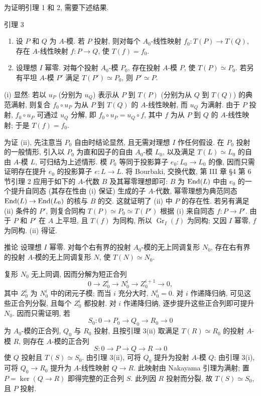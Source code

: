 为证明引理 1 和 2, 需要下述结果.

\begin{statement}{引理 3}
\begin{enumerate}[label=(\roman*)]
\item 设 $P$ 和 $Q$ 为 $A$-模. 若 $P$ 投射, 则对每个 $A_0$-线性映射 $f_0:T(P)\to T(Q)$, 存在 $A$-线性映射 $f:P\to Q$, 使 $T(f)=f_0$.
\item 设理想 $I$ 幂零. 对每个投射 $A_0$-模 $P_0$, 存在投射 $A$-模 $P$, 使 $T(P)\simeq P_0$. 若另有平坦 $A$-模 $P'$ 满足 $T(P')\simeq P_0$, 则 $P'\simeq P$.
\end{enumerate}
\end{statement}

(i) 显然: 若以 $u_P$ (分别为 $u_Q$) 表示从 $P$ 到 $T(P)$ (分别为从 $Q$ 到 $T(Q)$) 的典范满射, 则复合 $f_0\circ u_P$ 为从 $P$ 到 $T(Q)$ 的 $A$-线性映射, 而 $u_Q$ 为满射. 由于 $P$ 投射, $f_0\circ u_P$ 可通过 $u_Q$ 分解, 即 $f_0\circ u_P=u_Q\circ f$, 其中 $f$ 为从 $P$ 到 $Q$ 的 $A$-线性映射; 于是 $T(f)=f_0$.

为证 (ii), 先注意当 $P_0$ 自由时结论显然, 且无需对理想 $I$ 作任何假设. 在 $P_0$ 投射的一般情形, 引入以 $P_0$ 为直和因子的自由 $A_0$-模 $L_0$, 以及满足 $T(L)\simeq L_0$ 的自由 $A$-模 $L$, 可归结为上述情形. 模 $P_0$ 等同于投影算子 $e_0:L_0\to L_0$ 的像, 因而只需证明存在提升 $e_0$ 的投影算子 $e:L\to L$. 将 Bourbaki, 交换代数, 第 III 章 §4 第 6 节引理 2 应用于如下的 $A$-代数 $B$ 及其幂零理想即可: $B$ 为 $\operatorname{End}(L)$ 中由 $e_0$ 的一个提升自同态 (其存在性由 (i) 保证) 生成的子 $A$-代数, 幂零理想为典范同态 $\operatorname{End}(L)\to\operatorname{End}(L_0)$ 的核与 $B$ 的交. 这就证明了 (ii) 中 $P$ 的存在性. 若另有满足 (ii) 条件的 $P'$, 则复合同构 $T(P)\simeq P_0\simeq T(P')$ 根据 (i) 来自同态 $f:P\to P'$. 由于 $P$ 和 $P'$ 在 $A$ 上平坦, 且 $T(f)$ 为同构, 所以 $\operatorname{Gr}_I(f)$ 为同构; 又因 $I$ 幂零, $f$ 为同构. (ii) 得证.

\begin{statement}{推论}
设理想 $I$ 幂零. 对每个右有界的投射 $A_0$-模的无上同调复形 $N_0$, 存在右有界的投射 $A$-模的无上同调复形 $N$, 使 $T(N)\simeq N_0$.
\end{statement}

复形 $N_0$ 无上同调, 因而分解为短正合列
\[
0\longrightarrow Z_0^i\longrightarrow N_0^i\longrightarrow Z_0^{i+1}\longrightarrow0,
\]
其中 $Z_0^i$ 为 $N_0^i$ 中的闭元子模; 而当 $i$ 充分大时, $N_0^i=0$. 对 $i$ 作递降归纳, 可见这些正合列分裂, 且每个 $Z_0^i$ 都投射. 对 $i$ 作递降归纳, 逐步提升这些正合列即可提升 $N_0$. 因而只需证明, 若
\[
S_0:0\longrightarrow P_0\longrightarrow Q_0\longrightarrow R_0\longrightarrow0
\]
为 $A_0$-模的正合列, $Q_0$ 与 $R_0$ 投射, 且按引理 3(ii) 取满足 $T(R)\simeq R_0$ 的投射 $A$-模 $R$, 则存在 $A$-模的正合列
\[
S:0\longrightarrow P\longrightarrow Q\longrightarrow R\longrightarrow0
\]
使 $Q$ 投射且 $T(S)\simeq S_0$. 由引理 3(ii), 可将 $Q_0$ 提升为投射 $A$-模 $Q$; 由引理 3(i), 可将 $Q_0\to R_0$ 提升为 $A$-线性映射 $Q\to R$. 此映射由 Nakayama 引理为满射; 置 $P=\ker(Q\to R)$ 即得完整的正合列 $S$. 此列因 $R$ 投射而分裂, 故 $T(S)\simeq S_0$, 且 $P$ 投射.

